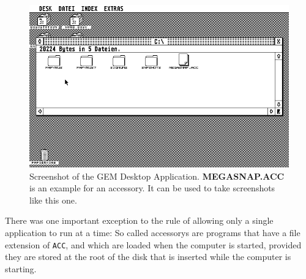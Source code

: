 \begin{figure}[h]
    \includegraphics[width=\columnwidth]{img/SNAP2.png}
    \caption{Screenshot of the GEM Desktop Application. \textbf{MEGASNAP.ACC} is an example for an accessory. It can be used to take screenshots like this one.}
\end{figure}

There was one important exception to the rule of allowing only a single application to run at a time: So called \glspl{accessory} are programs that have a file extension of \texttt{ACC}, and which are loaded when the computer is started, provided they are stored at the root of the disk that is inserted while the computer is starting.